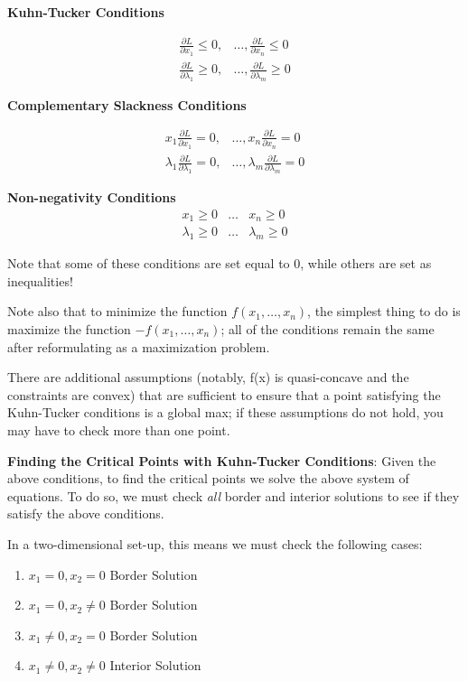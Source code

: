\documentclass[
]{book}
\providecommand{\tightlist}{%
  \setlength{\itemsep}{0pt}\setlength{\parskip}{0pt}}
\theoremstyle{definition}
\theoremstyle{definition}
\theoremstyle{definition}
\theoremstyle{remark}
\begin{document}
\textbf{Kuhn-Tucker Conditions}

\begin{align*}
\frac{\partial L}{\partial x_1} \leq 0, & \dots, \frac{\partial L}{\partial x_n} \leq 0\\
\frac{\partial L}{\partial \lambda_1} \geq 0, & \dots, \frac{\partial L}{\partial \lambda_m} \geq 0
\end{align*}

\textbf{Complementary Slackness Conditions}

\begin{align*}
x_1\frac{\partial L}{\partial x_1} = 0, & \dots, x_n\frac{\partial L}{\partial x_n} = 0\\
\lambda_1\frac{\partial L}{\partial \lambda_1} = 0, & \dots, \lambda_m \frac{\partial L}{\partial \lambda_m} = 0
\end{align*}

\textbf{Non-negativity Conditions}
\begin{eqnarray*}
x_1 \geq 0 & \dots & x_n \geq 0\\
\lambda_1 \geq 0 & \dots & \lambda_m \geq 0
\end{eqnarray*}

Note that some of these conditions are set equal to 0, while others are set as inequalities!

Note also that to minimize the function \(f(x_1, \dots, x_n)\), the simplest thing to do is maximize the function \(-f(x_1, \dots, x_n)\); all of the conditions remain the same after reformulating as a maximization problem.

There are additional assumptions (notably, f(x) is quasi-concave and the constraints are convex) that are sufficient to ensure that a point satisfying the Kuhn-Tucker conditions is a global max; if these assumptions do not hold, you may have to check more than one point.

\textbf{Finding the Critical Points with Kuhn-Tucker Conditions}: Given the above conditions, to find the critical points we solve the above system of equations. To do so, we must check \textit{all} border and interior solutions to see if they satisfy the above conditions.

In a two-dimensional set-up, this means we must check the following cases:

\begin{enumerate}
\def\labelenumi{\arabic{enumi}.}
\tightlist
\item
  \(x_1 = 0, x_2 = 0\) Border Solution
\item
  \(x_1 = 0, x_2 \neq 0\) Border Solution
\item
  \(x_1 \neq 0, x_2 = 0\) Border Solution
\item
  \(x_1 \neq 0, x_2 \neq 0\) Interior Solution
\end{enumerate}
\end{document}
